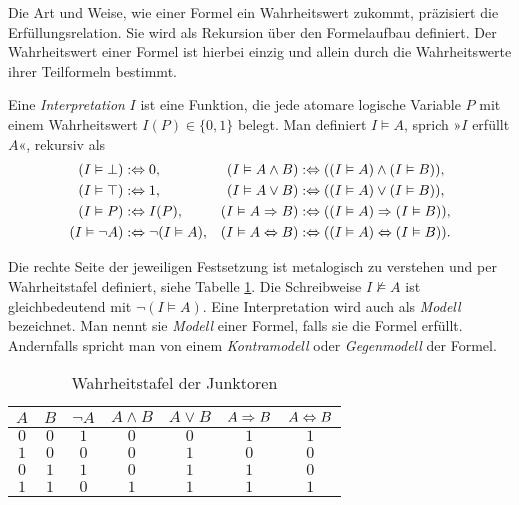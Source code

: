Die Art und Weise, wie einer Formel ein Wahrheitswert zukommt,
präzisiert die Erfüllungsrelation. Sie wird als Rekursion über den
Formelaufbau definiert. Der Wahrheitswert einer Formel ist hierbei
einzig und allein durch die Wahrheitswerte ihrer Teilformeln bestimmt.

\begin{Definition}[Erfüllungsrelation]%
\label{def:sat}\newlinefirst
Eine \emph{Interpretation} $I$ ist eine Funktion, die jede atomare
logische Variable $P$ mit einem Wahrheitswert $I(P)\in\{0,1\}$ belegt.
Man definiert $I\models A$, sprich »$I$ erfüllt $A$«, rekursiv als
\begin{align*}
(I\vDash\bot) &:\Leftrightarrow 0,
& (I\vDash A\land B) &:\Leftrightarrow ((I\vDash A)\land (I\vDash B)),\\
(I\vDash\top) &:\Leftrightarrow 1,
& (I\vDash A\lor B) &:\Leftrightarrow ((I\vDash A)\lor (I\vDash B)),\\
(I\vDash P) &:\Leftrightarrow I(P),
& (I\vDash A\Rightarrow B) &:\Leftrightarrow ((I\vDash A)\Rightarrow (I\vDash B)),\\
(I\vDash\lnot A) &:\Leftrightarrow \lnot (I\vDash A),
& (I\vDash A\Leftrightarrow B) &:\Leftrightarrow ((I\vDash A)\Leftrightarrow (I\vDash B)).
\end{align*}
\end{Definition}
Die rechte Seite der jeweiligen Festsetzung ist metalogisch zu verstehen
und per Wahrheitstafel definiert, siehe Tabelle \ref{tab:Junktoren}.
Die Schreibweise $I\nvDash A$ ist gleichbedeutend mit
$\lnot (I\models A)$. Eine Interpretation wird auch als \emph{Modell}
bezeichnet. Man nennt sie \emph{Modell} einer Formel, falls sie die
Formel erfüllt. Andernfalls spricht man von einem \emph{Kontramodell}
oder \emph{Gegenmodell} der Formel.

\begin{table}
\caption{Wahrheitstafel der Junktoren}
\label{tab:Junktoren}
\centering
\begin{tabular}{cc@{\qquad}c@{\qquad}c@{\qquad}c@{\qquad}c@{\qquad}c}
\toprule
$A$ & $B$ & $\lnot A$ & $A\land B$ & $A\lor B$ & $A\Rightarrow B$ & $A\Leftrightarrow B$\\
\midrule[\heavyrulewidth]
$0$ & $0$ & $1$ & $0$ & $0$ & $1$ & $1$\\
$1$ & $0$ & $0$ & $0$ & $1$ & $0$ & $0$\\
$0$ & $1$ & $1$ & $0$ & $1$ & $1$ & $0$\\
$1$ & $1$ & $0$ & $1$ & $1$ & $1$ & $1$\\
\bottomrule
\end{tabular}
\end{table}

